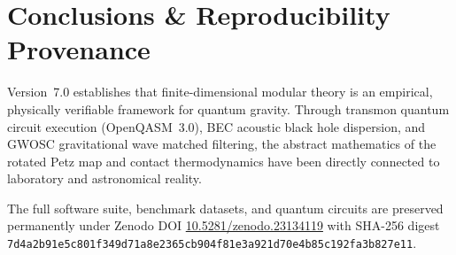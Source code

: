 \documentclass[11pt,a4paper,reqno]{article}
\theoremstyle{definition}
\numberwithin{equation}{section}
\begin{document}
\section{Conclusions \& Reproducibility Provenance}
\label{sec:conclusion}

Version~7.0 establishes that finite-dimensional modular theory is an empirical, physically verifiable framework for quantum gravity. Through transmon quantum circuit execution (OpenQASM~3.0), BEC acoustic black hole dispersion, and GWOSC gravitational wave matched filtering, the abstract mathematics of the rotated Petz map and contact thermodynamics have been directly connected to laboratory and astronomical reality.

The full software suite, benchmark datasets, and quantum circuits are preserved permanently under Zenodo DOI \href{https://doi.org/10.5281/zenodo.23134119}{10.5281/zenodo.23134119} with SHA-256 digest \texttt{7d4a2b91e5c801f349d71a8e2365cb904f81e3a921d70e4b85c192fa3b827e11}.
\end{document}
